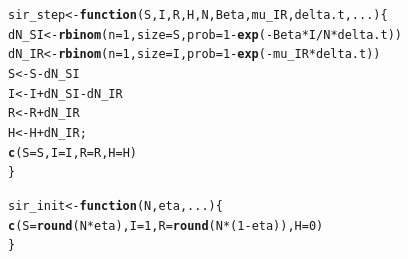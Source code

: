 \documentclass{beamer}\usepackage[]{graphicx}\usepackage[]{color}
\makeatletter
\newcommand{\hlnum}[1]{\textcolor[rgb]{0.686,0.059,0.569}{#1}}%
\newcommand{\hlopt}[1]{\textcolor[rgb]{0,0,0}{#1}}%
\newcommand{\hlstd}[1]{\textcolor[rgb]{0.345,0.345,0.345}{#1}}%
\newcommand{\hlkwa}[1]{\textcolor[rgb]{0.161,0.373,0.58}{\textbf{#1}}}%
\newcommand{\hlkwb}[1]{\textcolor[rgb]{0.69,0.353,0.396}{#1}}%
\newcommand{\hlkwc}[1]{\textcolor[rgb]{0.333,0.667,0.333}{#1}}%
\newcommand{\hlkwd}[1]{\textcolor[rgb]{0.737,0.353,0.396}{\textbf{#1}}}%
\newenvironment{kframe}{%
 \def\at@end@of@kframe{}%
 \ifinner\ifhmode%
  \def\at@end@of@kframe{\end{minipage}}%
  \begin{minipage}{\columnwidth}%
 \fi\fi%
 \def\FrameCommand##1{\hskip\@totalleftmargin \hskip-\fboxsep
 \colorbox{shadecolor}{##1}\hskip-\fboxsep
     \hskip-\linewidth \hskip-\@totalleftmargin \hskip\columnwidth}%
 \MakeFramed {\advance\hsize-\width
   \@totalleftmargin\z@ \linewidth\hsize
   \@setminipage}}%
 {\par\unskip\endMakeFramed%
 \at@end@of@kframe}
\newenvironment{knitrout}{}{} %
\makeatother
\begin{document}
\begin{frame}[fragile]

\begin{knitrout}\small
{}\color{fgcolor}\begin{kframe}
\begin{alltt}
\hlstd{sir_step} \hlkwb{<-} \hlkwa{function} \hlstd{(}\hlkwc{S}\hlstd{,} \hlkwc{I}\hlstd{,} \hlkwc{R}\hlstd{,} \hlkwc{H}\hlstd{,} \hlkwc{N}\hlstd{,} \hlkwc{Beta}\hlstd{,} \hlkwc{mu_IR}\hlstd{,} \hlkwc{delta.t}\hlstd{,} \hlkwc{...}\hlstd{) \{}
  \hlstd{dN_SI} \hlkwb{<-} \hlkwd{rbinom}\hlstd{(}\hlkwc{n}\hlstd{=}\hlnum{1}\hlstd{,}\hlkwc{size}\hlstd{=S,}\hlkwc{prob}\hlstd{=}\hlnum{1}\hlopt{-}\hlkwd{exp}\hlstd{(}\hlopt{-}\hlstd{Beta}\hlopt{*}\hlstd{I}\hlopt{/}\hlstd{N}\hlopt{*}\hlstd{delta.t))}
  \hlstd{dN_IR} \hlkwb{<-} \hlkwd{rbinom}\hlstd{(}\hlkwc{n}\hlstd{=}\hlnum{1}\hlstd{,}\hlkwc{size}\hlstd{=I,}\hlkwc{prob}\hlstd{=}\hlnum{1}\hlopt{-}\hlkwd{exp}\hlstd{(}\hlopt{-}\hlstd{mu_IR}\hlopt{*}\hlstd{delta.t))}
  \hlstd{S} \hlkwb{<-} \hlstd{S} \hlopt{-} \hlstd{dN_SI}
  \hlstd{I} \hlkwb{<-} \hlstd{I} \hlopt{+} \hlstd{dN_SI} \hlopt{-} \hlstd{dN_IR}
  \hlstd{R} \hlkwb{<-} \hlstd{R} \hlopt{+} \hlstd{dN_IR}
  \hlstd{H} \hlkwb{<-} \hlstd{H} \hlopt{+} \hlstd{dN_IR;}
  \hlkwd{c}\hlstd{(}\hlkwc{S} \hlstd{= S,} \hlkwc{I} \hlstd{= I,} \hlkwc{R} \hlstd{= R,} \hlkwc{H} \hlstd{= H)}
\hlstd{\}}

\hlstd{sir_init} \hlkwb{<-} \hlkwa{function} \hlstd{(}\hlkwc{N}\hlstd{,} \hlkwc{eta}\hlstd{,} \hlkwc{...}\hlstd{) \{}
  \hlkwd{c}\hlstd{(}\hlkwc{S} \hlstd{=} \hlkwd{round}\hlstd{(N}\hlopt{*}\hlstd{eta),} \hlkwc{I} \hlstd{=} \hlnum{1}\hlstd{,} \hlkwc{R} \hlstd{=} \hlkwd{round}\hlstd{(N}\hlopt{*}\hlstd{(}\hlnum{1}\hlopt{-}\hlstd{eta)),} \hlkwc{H} \hlstd{=} \hlnum{0}\hlstd{)}
\hlstd{\}}
\end{alltt}
\end{kframe}
\end{knitrout}

\end{frame}
\end{document}
